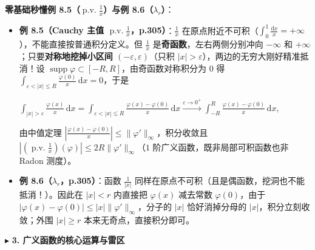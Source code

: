 \documentclass[11pt,a4paper]{article}
\providecommand{\tightlist}{\setlength{\itemsep}{1.8pt}\setlength{\parskip}{0pt}}
\newcommand{\SubSubHeading}[1]{%
  \Needspace{6.5\baselineskip}\vspace{5.5pt}\noindent
  \textcolor{AccentMain}{\scriptsize$\blacktriangleright$}\hspace{4pt}%
  {\small\bfseries\color{AccentMain}#1}\par\nopagebreak[4]\vspace{2.5pt}%
}
\renewenvironment{quote}{%
  \begin{tcolorbox}[
    enhanced,
    breakable,
    colback=AccentSoft!48!white,
    colframe=AccentMain,
    boxrule=0pt,
    leftrule=2.8pt,
    arc=2.5pt,
    left=9pt, right=8pt, top=6pt, bottom=6pt,
    before skip=5.5pt, after skip=5.5pt
  ]\small
}{%
  \end{tcolorbox}%
}
\newcommand{\FitDisplayMath}[1]{%
  \par\vspace{4pt}\noindent
  \begin{adjustbox}{max width=\linewidth, center}
    $\displaystyle #1$
  \end{adjustbox}
  \par\vspace{4pt}%
}
\begin{document}
\begin{quote}
\textbf{零基础秒懂例 8.5（\(\operatorname{p.v.}\frac{1}{x}\)）与例 8.6（\(\lambda_r\)）}：

\begin{itemize}
\tightlist
\item
  \textbf{例 8.5（Cauchy 主值 \(\operatorname{p.v.}\frac{1}{x}\)，p.305）}：\(\frac{1}{x}\) 在原点附近不可积（\(\int_0^1 \frac{\mathrm{d}x}{x} = +\infty\)），不能直接按普通积分定义。但 \(\frac{1}{x}\) 是\textbf{奇函数}，左右两侧分别冲向 \(-\infty\) 和 \(+\infty\)；只要\textbf{对称地挖掉小区间 \((-\varepsilon, \varepsilon)\)}（只积 \(|x|>\varepsilon\)），两边的无穷大刚好精准抵消！设 \(\operatorname{supp}\varphi \subset [-R, R]\)，由奇函数对称积分为 \(0\) 得 \(\int_{\varepsilon<|x|\le R}\frac{\varphi(0)}{x}\,\mathrm{d}x = 0\)，于是 
\FitDisplayMath{\int_{|x|>\varepsilon}\frac{\varphi(x)}{x}\,\mathrm{d}x = \int_{\varepsilon<|x|\le R}\frac{\varphi(x)-\varphi(0)}{x}\,\mathrm{d}x \xrightarrow{\varepsilon\to 0^+} \int_{-R}^{R}\frac{\varphi(x)-\varphi(0)}{x}\,\mathrm{d}x,}
 由中值定理 \(\left|\frac{\varphi(x)-\varphi(0)}{x}\right| \le \|\varphi'\|_\infty\)，积分收敛且 \(\left|\left(\operatorname{p.v.}\frac{1}{x}\right)(\varphi)\right| \le 2R\|\varphi'\|_\infty\)（\(1\) 阶广义函数，既非局部可积函数也非 Radon 测度）。
\item
  \textbf{例 8.6（\(\lambda_r\)，p.305）}：函数 \(\frac{1}{|x|}\) 同样在原点不可积（且是偶函数，挖洞也不能抵消！）。因此在 \(|x|<r\) 内直接把 \(\varphi(x)\) 减去常数 \(\varphi(0)\)，由于 \(|\varphi(x)-\varphi(0)| \le |x|\|\varphi'\|_\infty\)，分子的 \(|x|\) 恰好消掉分母的 \(|x|\)，积分立刻收敛；外围 \(|x|\ge r\) 本来无奇点，直接积分即可。
\end{itemize}
\end{quote}

\SubSubHeading{3. 广义函数的核心运算与雷区}
\end{document}
